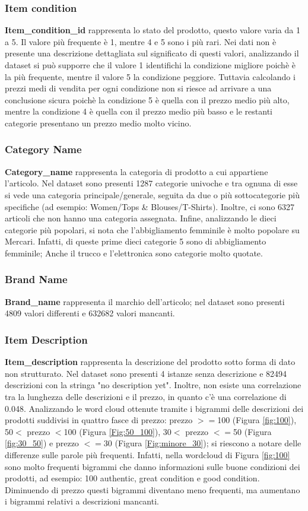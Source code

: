 
\subsubsection{Item condition}
\textbf{Item\_condition\_id} rappresenta lo stato del prodotto, questo valore varia da 1 a 5.
Il valore più frequente è 1, mentre 4 e 5 sono i più rari. Nei dati non è presente una descrizione dettagliata sul significato di questi valori, analizzando il dataset si può supporre che il valore 1 identifichi la condizione migliore poichè è la più frequente, mentre il valore 5 la condizione peggiore. Tuttavia calcolando i prezzi medi di vendita per ogni condizione non si riesce ad arrivare a una conclusione sicura poichè la condizione 5 è quella con il prezzo medio più alto, mentre la condizione 4 è quella con il prezzo medio più basso e le restanti categorie presentano un prezzo medio molto vicino.
\subsubsection{Category Name}
\textbf{Category\_name} rappresenta la categoria di prodotto a cui appartiene l'articolo.
Nel dataset sono presenti 1287 categorie univoche e tra ognuna di esse si vede una categoria principale/generale, seguita da due o più sottocategorie più specifiche (ad esempio: Women/Tops \& Blouses/T-Shirts). Inoltre, ci sono 6327 articoli che non hanno una categoria assegnata.
Infine, analizzando le dieci categorie più popolari, si nota che l'abbigliamento femminile è molto popolare su Mercari. Infatti, di queste prime dieci categorie 5 sono di abbigliamento femminile; Anche il trucco e l'elettronica sono categorie molto quotate.
\subsubsection{Brand Name}
\textbf{Brand\_name} rappresenta il marchio dell'articolo; nel dataset sono presenti 4809 valori differenti e 632682 valori mancanti.
\subsubsection{Item Description}
\textbf{Item\_description} rappresenta la descrizione del prodotto sotto forma di dato non strutturato. Nel dataset sono presenti 4 istanze senza descrizione e 82494 descrizioni con la stringa "no description yet".
Inoltre, non esiste una correlazione tra la lunghezza delle descrizioni e il prezzo, in quanto c'è una correlazione di 0.048.
Analizzando le word cloud ottenute tramite i bigrammi delle descrizioni  dei prodotti suddivisi in quattro fasce di prezzo: prezzo $>=$100 (Figura \ref{fig:100}), 50$<$ prezzo $<$100 (Figura \ref{Fig:50_100}), 30$<$ prezzo $<=$50 (Figura \ref{fig:30_50}) e prezzo $<=30$ (Figura \ref{Fig:minore_30}); si riescono a notare delle differenze sulle parole più frequenti. Infatti, nella wordcloud di Figura \ref{fig:100} sono molto frequenti bigrammi che danno informazioni sulle buone condizioni dei prodotti, ad esempio:  100 authentic, great condition e good condition.
Diminuendo di prezzo questi bigrammi diventano meno frequenti, ma aumentano i bigrammi relativi a descrizioni mancanti.

